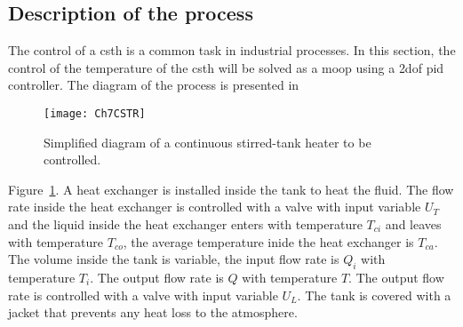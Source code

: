 \subsection{Description of the process}
\label{sec:Description}
%
The control of a \gls{csth} is a common task in industrial processes. In this section, the control of the temperature of the \gls{csth} will be solved as a \gls{moop} using a \gls{2dof} \gls{pid} controller. The diagram of the process is presented in %
\begin{figure}[b]
	\centering
	\texttt{[image: Ch7CSTR]}
	\caption{Simplified diagram of a continuous stirred-tank heater to be controlled.}
	\label{fig:Ch7CSTR}
\end{figure}
Figure~\ref{fig:Ch7CSTR}. A heat exchanger is installed inside the tank to heat the fluid. The flow rate inside the heat exchanger is controlled with a valve with input variable $U_T$ and the liquid inside the heat exchanger enters with temperature $T_{ci}$ and leaves with temperature $T_{co}$, the average temperature inide the heat exchanger is $T_{ca}$. The volume inside the tank is variable, the input flow rate is $Q_i$ with temperature $T_i$. The output flow rate is $Q$ with temperature $T$. The output flow rate is controlled with a valve with input variable $U_L$. The tank is covered with a jacket that prevents any heat loss to the atmosphere.

